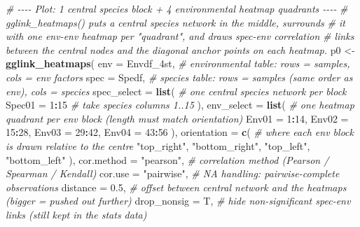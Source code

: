 \documentclass[
]{book}
\newenvironment{Shaded}{\begin{snugshade}}{\end{snugshade}}
\newcommand{\AttributeTok}[1]{\textcolor[rgb]{0.13,0.29,0.53}{#1}}
\newcommand{\CommentTok}[1]{\textcolor[rgb]{0.56,0.35,0.01}{\textit{#1}}}
\newcommand{\DecValTok}[1]{\textcolor[rgb]{0.00,0.00,0.81}{#1}}
\newcommand{\FloatTok}[1]{\textcolor[rgb]{0.00,0.00,0.81}{#1}}
\newcommand{\FunctionTok}[1]{\textcolor[rgb]{0.13,0.29,0.53}{\textbf{#1}}}
\newcommand{\NormalTok}[1]{#1}
\newcommand{\OtherTok}[1]{\textcolor[rgb]{0.56,0.35,0.01}{#1}}
\newcommand{\SpecialCharTok}[1]{\textcolor[rgb]{0.81,0.36,0.00}{\textbf{#1}}}
\newcommand{\StringTok}[1]{\textcolor[rgb]{0.31,0.60,0.02}{#1}}
\begin{document}
\begin{Shaded}
\begin{Highlighting}[]
\CommentTok{\# {-}{-}{-}{-} Plot: 1 central species block + 4 environmental heatmap quadrants {-}{-}{-}{-}}
\CommentTok{\# \textasciigrave{}gglink\_heatmaps()\textasciigrave{} puts a central species network in the middle, surrounds}
\CommentTok{\# it with one env{-}env heatmap per "quadrant", and draws spec{-}env correlation}
\CommentTok{\# links between the central nodes and the diagonal anchor points on each heatmap.}
\NormalTok{p0 }\OtherTok{\textless{}{-}} \FunctionTok{gglink\_heatmaps}\NormalTok{(}
  \AttributeTok{env                =}\NormalTok{ Envdf\_4st,        }\CommentTok{\# environmental table: rows = samples, cols = env factors}
  \AttributeTok{spec               =}\NormalTok{ Spedf,            }\CommentTok{\# species table: rows = samples (same order as env), cols = species}
  \AttributeTok{spec\_select        =} \FunctionTok{list}\NormalTok{(             }\CommentTok{\# one central species network per block}
    \AttributeTok{Spec01 =} \DecValTok{1}\SpecialCharTok{:}\DecValTok{15}                        \CommentTok{\#   take species columns 1..15}
\NormalTok{  ),}
  \AttributeTok{env\_select         =} \FunctionTok{list}\NormalTok{(             }\CommentTok{\# one heatmap quadrant per env block (length must match \textasciigrave{}orientation\textasciigrave{})}
    \AttributeTok{Env01 =} \DecValTok{1}\SpecialCharTok{:}\DecValTok{14}\NormalTok{,}
    \AttributeTok{Env02 =} \DecValTok{15}\SpecialCharTok{:}\DecValTok{28}\NormalTok{,}
    \AttributeTok{Env03 =} \DecValTok{29}\SpecialCharTok{:}\DecValTok{42}\NormalTok{,}
    \AttributeTok{Env04 =} \DecValTok{43}\SpecialCharTok{:}\DecValTok{56}
\NormalTok{  ),}
  \AttributeTok{orientation        =} \FunctionTok{c}\NormalTok{(                }\CommentTok{\# where each env block is drawn relative to the centre}
    \StringTok{"top\_right"}\NormalTok{,}
    \StringTok{"bottom\_right"}\NormalTok{,}
    \StringTok{"top\_left"}\NormalTok{,}
    \StringTok{"bottom\_left"}
\NormalTok{  ),}
  \AttributeTok{cor.method         =} \StringTok{"pearson"}\NormalTok{,        }\CommentTok{\# correlation method (Pearson / Spearman / Kendall)}
  \AttributeTok{cor.use            =} \StringTok{"pairwise"}\NormalTok{,       }\CommentTok{\# NA handling: pairwise{-}complete observations}
  \AttributeTok{distance           =} \FloatTok{0.5}\NormalTok{,              }\CommentTok{\# offset between central network and the heatmaps (bigger = pushed out further)}
  \AttributeTok{drop\_nonsig        =}\NormalTok{ T,                }\CommentTok{\# hide non{-}significant spec{-}env links (still kept in the stats data)}

\end{Highlighting}
\end{Shaded}
\end{document}
